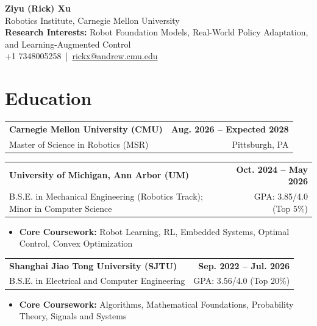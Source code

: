 \documentclass[11pt,letterpaper]{article}
\makeatletter
\newcommand{\resumeSubheading}[4]{
    \begin{tabularx}{\textwidth}{@{}Xr@{}}
        \textbf{#1} & \textbf{#2} \\
        #3 & #4 \\
    \end{tabularx}
}
\makeatother
\begin{document}
\begin{center}
    {\LARGE \textbf{Ziyu (Rick) Xu}} \\[2pt]
    {\small Robotics Institute, Carnegie Mellon University} \\[1pt]
    {\small \textbf{Research Interests:} Robot Foundation Models, Real-World Policy Adaptation, and Learning-Augmented Control} \\[1pt]
    {\small
    +1 7348005258
    \,|\, 
    \href{mailto:rickx@andrew.cmu.edu}{rickx@andrew.cmu.edu}
    } \\[1pt]
\end{center}

\section*{Education}
\resumeSubheading
{Carnegie Mellon University (CMU)}
{Aug. 2026 -- Expected 2028}
{\hspace*{1.4em}Master of Science in Robotics (MSR)}
{Pittsburgh, PA}
\resumeSubheading
{University of Michigan, Ann Arbor (UM)}
{Oct. 2024 -- May 2026}
{\hspace*{1.4em}B.S.E. in Mechanical Engineering (Robotics Track); Minor in Computer Science}
{GPA: 3.85/4.0 (Top 5\%)}
\begin{itemize}[leftmargin=2.4em, itemsep=0.5pt, topsep=0pt]
    \item \textbf{Core Coursework:} Robot Learning, RL, Embedded Systems, Optimal Control, Convex Optimization
\end{itemize}

\resumeSubheading
{Shanghai Jiao Tong University (SJTU)}
{Sep. 2022 -- Jul. 2026}
{\hspace*{1.4em}B.S.E. in Electrical and Computer Engineering}
{GPA: 3.56/4.0 (Top 20\%)}
\begin{itemize}[leftmargin=2.4em, itemsep=0.5pt, topsep=0pt]
    \item \textbf{Core Coursework:} Algorithms, Mathematical Foundations, Probability Theory, Signals and Systems
\end{itemize}
\end{document}
